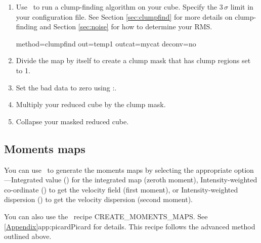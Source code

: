 \documentclass[11pt,oneside,chapters]{starlink}
\providecommand{\nomagic}{\xref{\task{nomagic}}{sun95}{NOMAGIC}}
\begin{document}
\begin{enumerate}[label=(\arabic*)]
\item Use \findclumps\ to run a clump-finding algorithm on your cube.
Specify the 3\,$\sigma$ limit in your configuration file. See Section
\ref{sec:clumpfind} for more details on clump-finding and Section
\ref{sec:noise} for how to determine your RMS.
\begin{terminalv}
  method=clumpfind out=temp1 outcat=mycat deconv=no
\end{terminalv}

\item Divide the map by itself to create a clump mask that has clump
regions set to 1.
\begin{terminalv}
\end{terminalv}

\item Set the bad data to zero using \Kappa:\nomagic.
\begin{terminalv}
\end{terminalv}

\item Multiply your reduced cube by the clump mask.
\begin{terminalv}
\end{terminalv}

\item Collapse your masked reduced cube.
\begin{terminalv}
\end{terminalv}
\end{enumerate}

\subsection{Moments maps}

You can use \collapse\ to generate the moments maps by selecting the
appropriate  option---Integrated value
() for the integrated map (zeroth moment),
Intensity-weighted co-ordinate () to get the velocity field
(first moment), or Intensity-weighted dispersion () to get the
velocity dispersion (second moment).

\begin{tip}
You can also use the \picard\ recipe CREATE\_MOMENTS\_MAPS. See
\cref{Appendix}{app:picard}{Picard} for details. This recipe follows
the advanced method outlined above.
\end{tip}
\end{document}
